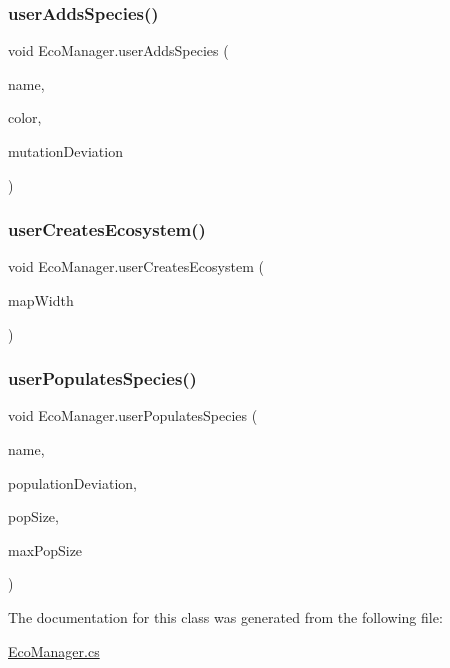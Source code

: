 \mbox{\label{class_eco_manager_ae6ddbd7e4c1fe49dafdf9cf72e121563}} 
\subsubsection{\texorpdfstring{user\+Adds\+Species()}{userAddsSpecies()}}
{\footnotesize\ttfamily void Eco\+Manager.\+user\+Adds\+Species (\begin{DoxyParamCaption}\item[{string}]{name,  }\item[{\mbox{\hyperlink{_creature_editor_8cs_a2d31a955c823bd51aec8f913e263723c}{Color\+Choice}}}]{color,  }\item[{float}]{mutation\+Deviation }\end{DoxyParamCaption})}

\mbox{\label{class_eco_manager_a14997719023cc4431bf3b8ee2339163d}} 
\subsubsection{\texorpdfstring{user\+Creates\+Ecosystem()}{userCreatesEcosystem()}}
{\footnotesize\ttfamily void Eco\+Manager.\+user\+Creates\+Ecosystem (\begin{DoxyParamCaption}\item[{int}]{map\+Width }\end{DoxyParamCaption})}

\mbox{\label{class_eco_manager_afff509be31e995fff88fd410bb96899f}} 
\subsubsection{\texorpdfstring{user\+Populates\+Species()}{userPopulatesSpecies()}}
{\footnotesize\ttfamily void Eco\+Manager.\+user\+Populates\+Species (\begin{DoxyParamCaption}\item[{string}]{name,  }\item[{float}]{population\+Deviation,  }\item[{int}]{pop\+Size,  }\item[{int}]{max\+Pop\+Size }\end{DoxyParamCaption})}



The documentation for this class was generated from the following file\+:\begin{DoxyCompactItemize}
\item 
\mbox{\hyperlink{_eco_manager_8cs}{Eco\+Manager.\+cs}}\end{DoxyCompactItemize}
